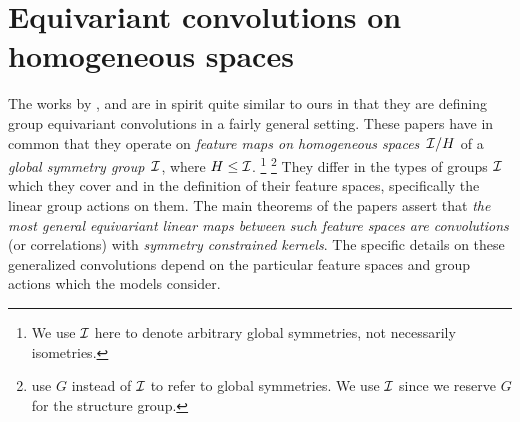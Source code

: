 

\section{Equivariant convolutions on homogeneous spaces}
\label{apx:homogeneous_conv}

The works by \citet{Kondor2018-GENERAL}, \citet{Cohen2018-intertwiners}\cite{Cohen2019-generaltheory} and \citet{bekkers2020bspline} are in spirit quite similar to ours in that they are defining group equivariant convolutions in a fairly general setting.
These papers have in common that they operate on \emph{feature maps on homogeneous spaces}~$\mathcal{I}/H$ of a \emph{global symmetry group}~$\mathcal{I}$, where $H\leq\mathcal{I}$.%
\footnote{
    We use $\mathcal{I}$ here to denote arbitrary global symmetries, not necessarily isometries.
}%
\footnote{
    \cite{Kondor2018-GENERAL,Cohen2019-generaltheory,bekkers2020bspline} use $G$ instead of $\mathcal{I}$ to refer to global symmetries.
    We use $\mathcal{I}$ since we reserve $G$ for the structure group.
}
They differ in the types of groups $\mathcal{I}$ which they cover and in the definition of their feature spaces, specifically the linear group actions on them.
The main theorems of the papers assert that \emph{the most general equivariant linear maps between such feature spaces are convolutions} (or correlations) with \emph{symmetry constrained kernels}.
The specific details on these generalized convolutions depend on the particular feature spaces and group actions which the models consider.

